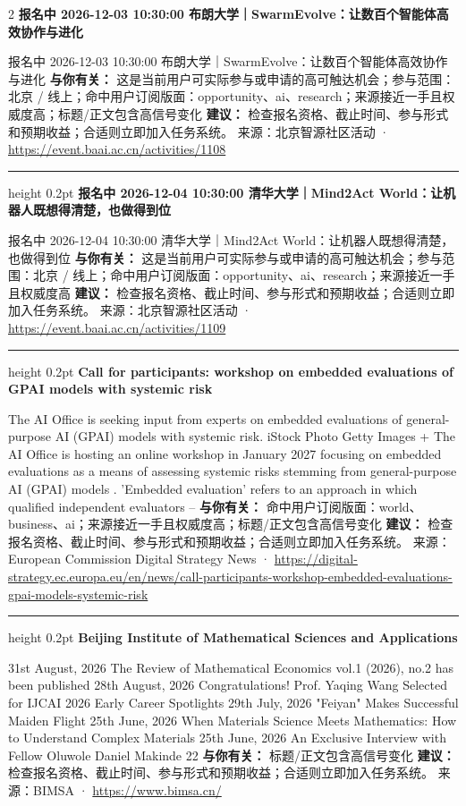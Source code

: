 \documentclass[10.5pt]{ctexart}
\begin{document}
\begin{multicols}{2}
{\large\bfseries 报名中 2026-12-03 10:30:00 布朗大学｜SwarmEvolve：让数百个智能体高效协作与进化}\par
报名中 2026-12-03 10:30:00 布朗大学｜SwarmEvolve：让数百个智能体高效协作与进化
\textbf{与你有关：} 这是当前用户可实际参与或申请的高可触达机会；参与范围：北京 / 线上；命中用户订阅版面：opportunity、ai、research；来源接近一手且权威度高；标题/正文包含高信号变化
\textbf{建议：} 检查报名资格、截止时间、参与形式和预期收益；合适则立即加入任务系统。
{\footnotesize\color{ormuted} 来源：北京智源社区活动 · \url{https://event.baai.ac.cn/activities/1108}}
\vspace{2mm}
\hrule height 0.2pt
\vspace{2mm}
{\large\bfseries 报名中 2026-12-04 10:30:00 清华大学｜Mind2Act World：让机器人既想得清楚，也做得到位}\par
报名中 2026-12-04 10:30:00 清华大学｜Mind2Act World：让机器人既想得清楚，也做得到位
\textbf{与你有关：} 这是当前用户可实际参与或申请的高可触达机会；参与范围：北京 / 线上；命中用户订阅版面：opportunity、ai、research；来源接近一手且权威度高
\textbf{建议：} 检查报名资格、截止时间、参与形式和预期收益；合适则立即加入任务系统。
{\footnotesize\color{ormuted} 来源：北京智源社区活动 · \url{https://event.baai.ac.cn/activities/1109}}
\vspace{2mm}
\hrule height 0.2pt
\vspace{2mm}
{\large\bfseries Call for participants: workshop on embedded evaluations of GPAI models with systemic risk}\par
The AI Office is seeking input from experts on embedded evaluations of general-purpose AI (GPAI) models with systemic risk. iStock Photo Getty Images + The AI Office is hosting an online workshop in January 2027 focusing on embedded evaluations as a means of assessing systemic risks stemming from general-purpose AI (GPAI) models . 'Embedded evaluation' refers to an approach in which qualified independent evaluators –
\textbf{与你有关：} 命中用户订阅版面：world、business、ai；来源接近一手且权威度高；标题/正文包含高信号变化
\textbf{建议：} 检查报名资格、截止时间、参与形式和预期收益；合适则立即加入任务系统。
{\footnotesize\color{ormuted} 来源：European Commission Digital Strategy News · \url{https://digital-strategy.ec.europa.eu/en/news/call-participants-workshop-embedded-evaluations-gpai-models-systemic-risk}}
\vspace{2mm}
\hrule height 0.2pt
\vspace{2mm}
{\large\bfseries Beijing Institute of Mathematical Sciences and Applications}\par
31st August, 2026 The Review of Mathematical Economics vol.1 (2026), no.2 has been published 28th August, 2026 Congratulations! Prof. Yaqing Wang Selected for IJCAI 2026 Early Career Spotlights 29th July, 2026 "Feiyan" Makes Successful Maiden Flight 25th June, 2026 When Materials Science Meets Mathematics: How to Understand Complex Materials 25th June, 2026 An Exclusive Interview with Fellow Oluwole Daniel Makinde 22
\textbf{与你有关：} 标题/正文包含高信号变化
\textbf{建议：} 检查报名资格、截止时间、参与形式和预期收益；合适则立即加入任务系统。
{\footnotesize\color{ormuted} 来源：BIMSA · \url{https://www.bimsa.cn/}}
\end{multicols}
\end{document}
